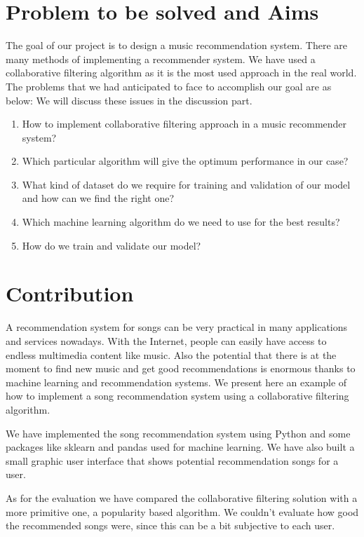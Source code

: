 \documentclass{jot}
\begin{document}
\section{Problem to be solved and Aims}
The goal of our project is to design a music recommendation system. There are many methods of implementing a recommender system. We have used a collaborative filtering algorithm as it is the most used approach in the real world.
The problems that we had anticipated to face to accomplish our goal are as below: We will discuss these issues in the discussion part.
\begin{enumerate}
  \item How to implement collaborative filtering approach in a music recommender system?
  \item Which particular algorithm will give the optimum performance in our case?
  \item What kind of dataset do we require for training and validation of our model and how can we find the right one?
  \item Which machine learning algorithm do we need to use for the best results?
  \item How do we train and validate our model?
\end{enumerate}

\section{Contribution}
A recommendation system for songs can be very practical in many applications and services nowadays. With the Internet, people can easily have access to endless multimedia content like music. Also the potential that there is at the moment to find new music and get good recommendations is enormous thanks to machine learning and recommendation systems. We present here an example of how to implement a song recommendation system using a collaborative filtering algorithm.

We have implemented the song recommendation system using Python and some packages like sklearn and pandas used for machine learning. We have also built a small graphic user interface that shows potential recommendation songs for a user.

As for the evaluation we have compared the collaborative filtering solution with a more primitive one, a popularity based algorithm. We couldn’t evaluate how good the recommended songs were, since this can be a bit subjective to each user.
\end{document}

